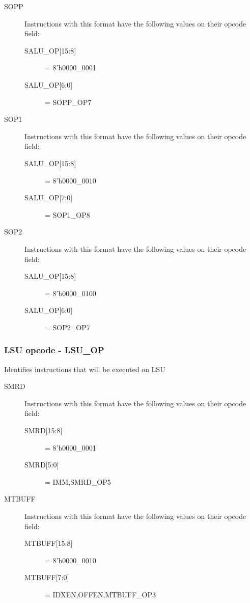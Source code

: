 \documentclass{article}
\begin{document}
\begin{description}
\item[SOPP] Instructions with this format have the following values on their opcode field:
  \begin{description}
  \item[{SALU\_OP[15:8]}] = 8'b0000\_0001
  \item[{SALU\_OP[6:0]}] = SOPP\_OP7
  \end{description}

\item[SOP1] Instructions with this format have the following values on their opcode field:
  \begin{description}
  \item[{SALU\_OP[15:8]}] = 8'b0000\_0010
  \item[{SALU\_OP[7:0]}] = SOP1\_OP8
  \end{description}

\item[SOP2] Instructions with this format have the following values on their opcode field:
  \begin{description}
  \item[{SALU\_OP[15:8]}] = 8'b0000\_0100
  \item[{SALU\_OP[6:0]}] = SOP2\_OP7
  \end{description}
\end{description}

\subsubsection{LSU opcode - LSU\_OP}
Identifies instructions that will be executed on LSU

\begin{description}
\item[SMRD] Instructions with this format have the following values on their opcode field:
  \begin{description}
  \item[{SMRD[15:8]}] = 8'b0000\_0001
  \item[{SMRD[5:0]}] = {IMM,SMRD\_OP5}
  \end{description}

\item[MTBUFF] Instructions with this format have the following values on their opcode field:
  \begin{description}
  \item[{MTBUFF[15:8]}] = 8'b0000\_0010
  \item[{MTBUFF[7:0]}] = {IDXEN,OFFEN,MTBUFF\_OP3}
  \end{description}

\end{description}
\end{document}
